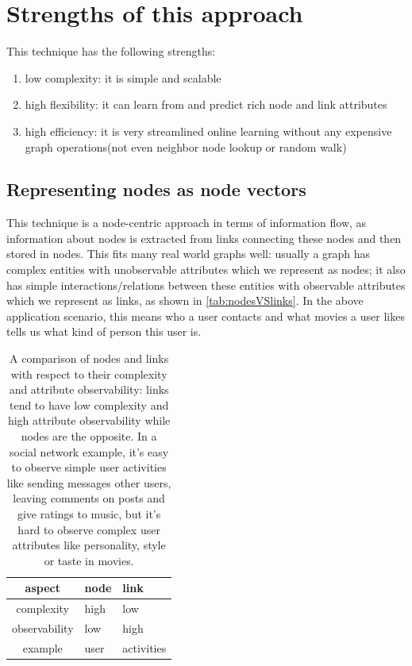\documentclass{article}
\begin{document}
\section{Strengths of this approach}
This technique has the following strengths:
\begin{enumerate}
	\item low complexity: it is simple and scalable
	\item high flexibility: it can learn from and predict rich node and link 
	attributes
	\item high efficiency: it is very streamlined online learning without any 
	expensive graph operations(not even neighbor node lookup or random walk)
\end{enumerate}
\subsection{Representing nodes as node vectors}
This technique is a node-centric approach in terms of information flow, as 
information about nodes is extracted from links connecting these nodes and then 
stored in nodes.
This fits many real world graphs well: usually a graph has complex entities 
with unobservable attributes which we represent as nodes; it also has simple 
interactions/relations between these entities with observable attributes which 
we represent as links, as shown in \autoref{tab:nodesVSlinks}.
In the above application scenario, this means who a user contacts and what 
movies a user likes tells us what kind of person this user is.
\begin{table}[h]
	\centering
	\begin{tabularx}{0.5\textwidth}{ |c|X|X| } \hline
		aspect  & node & link \\ \hline
		complexity & high & low \\ \hline
		observability & low & high \\ \hline
		example & user & activities \\ \hline
	\end{tabularx}
	\caption{A comparison of nodes and links with respect to their complexity 
		and attribute observability:
		links tend to have low complexity and high attribute observability 
		while nodes are the opposite.
		In a social network example,
		it's easy to observe simple user activities like sending messages other 
		users,
		leaving comments on posts and give ratings to music,
		but it's hard to observe complex user attributes like personality, 
		style or taste in movies.}
	\label{tab:nodesVSlinks}
\end{table}
\end{document}
